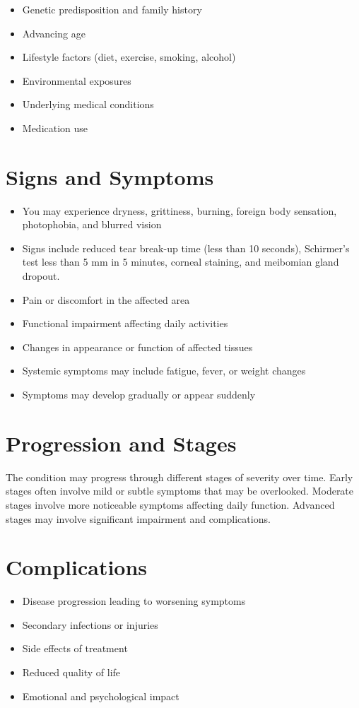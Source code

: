 \begin{itemize}[noitemsep]
  \item Genetic predisposition and family history
  \item Advancing age
  \item Lifestyle factors (diet, exercise, smoking, alcohol)
  \item Environmental exposures
  \item Underlying medical conditions
  \item Medication use
\end{itemize}
\section{Signs and Symptoms}
\begin{itemize}[noitemsep]
  \item You may experience dryness, grittiness, burning, foreign body sensation, photophobia, and blurred vision
  \item Signs include reduced tear break-up time (less than 10 seconds), Schirmer's test less than 5 mm in 5 minutes, corneal staining, and meibomian gland dropout.
  \item Pain or discomfort in the affected area
  \item Functional impairment affecting daily activities
  \item Changes in appearance or function of affected tissues
  \item Systemic symptoms may include fatigue, fever, or weight changes
  \item Symptoms may develop gradually or appear suddenly
\end{itemize}
\section{Progression and Stages}
The condition may progress through different stages of severity over time. Early stages often involve mild or subtle symptoms that may be overlooked. Moderate stages involve more noticeable symptoms affecting daily function. Advanced stages may involve significant impairment and complications.
\section{Complications}
\begin{itemize}[noitemsep]
  \item Disease progression leading to worsening symptoms
  \item Secondary infections or injuries
  \item Side effects of treatment
  \item Reduced quality of life
  \item Emotional and psychological impact
\end{itemize}
